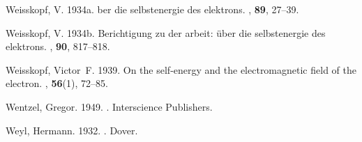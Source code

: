 \documentclass[onecolumn,secnumarabic,amsmath,amssymb,balancelastpage,nofootinbib]{article}
\newcommand{\noop}[1]{}
\begin{document}
\begin{thebibliography}{}
Weisskopf, V. 1934a.
\newblock {\noop{AAA}}{\"U}ber die selbstenergie des elektrons.
, {\bf 89}, 27--39.

Weisskopf, V. 1934b.
\newblock Berichtigung zu der arbeit: {\"u}ber die selbstenergie des elektrons.
, {\bf 90}, 817--818.

Weisskopf, Victor~F. 1939.
\newblock On the self-energy and the electromagnetic field of the electron.
, {\bf 56}(1), 72--85.

Wentzel, Gregor. 1949.
.
\newblock Interscience Publishers.

Weyl, Hermann. 1932.
.
\newblock Dover.

\end{thebibliography}
\end{document}
